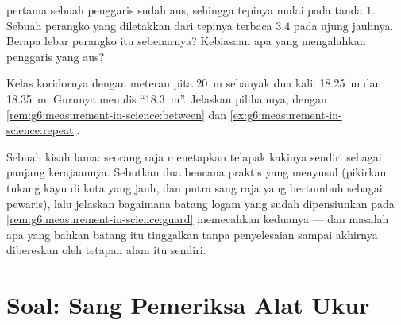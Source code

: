 \begin{exercise}[$\star\star$]\label{exo:g6:measurement-in-science:10}
 pertama sebuah penggaris sudah aus, sehingga tepinya mulai
pada tanda $1$. Sebuah perangko yang diletakkan dari tepinya terbaca
$3.4$ pada ujung jauhnya. Berapa lebar perangko itu sebenarnya?
Kebiasaan apa yang mengalahkan penggaris yang aus?
\end{exercise}

\begin{exercise}[$\star\star$]\label{exo:g6:measurement-in-science:11}
Kelas  koridornya dengan meteran pita \qty{20}{m} sebanyak dua
kali: \qty{18.25}{m} dan \qty{18.35}{m}. Gurunya menulis
``\qty{18.3}{m}''. Jelaskan pilihannya, dengan
\cref{rem:g6:measurement-in-science:between} dan
\cref{ex:g6:measurement-in-science:repeat}.
\end{exercise}

\begin{exercise}[$\star\star\star$]\label{exo:g6:measurement-in-science:12}
Sebuah kisah lama: seorang raja menetapkan telapak kakinya sendiri
sebagai  panjang kerajaannya. Sebutkan dua bencana praktis yang
menyusul (pikirkan tukang kayu di kota yang jauh, dan putra sang raja
yang bertumbuh sebagai pewaris), lalu jelaskan bagaimana batang logam
yang sudah dipensiunkan pada
\cref{rem:g6:measurement-in-science:guard} memecahkan keduanya ---
dan masalah apa yang bahkan batang itu tinggalkan tanpa penyelesaian
sampai akhirnya dibereskan oleh tetapan alam itu sendiri.
\end{exercise}

\section{Soal: Sang Pemeriksa Alat Ukur}

